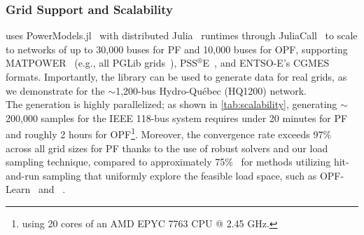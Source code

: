 \subsubsection{Grid Support and Scalability}
\datakit uses PowerModels.jl~\cite{powermodels} with distributed Julia~\cite{julia} runtimes through JuliaCall~\cite{juliacall} to scale to networks of up to 30{,}000 buses for PF and 10{,}000 buses for OPF, supporting MATPOWER~\cite{matpower} (e.g., all PGLib grids~\cite{pglib}), PSS$^{\circledR}$E~\cite{siemens_psse_v34}, and ENTSO-E's CGMES~\cite{entsoe_cim_network_model_management_guide} formats. Importantly, the library can be used to generate data for real grids, as we demonstrate for the $\sim$1{,}200-bus Hydro-Qu\'ebec (HQ1200) network.\\

The generation is highly parallelized; as shown in \cref{tab:scalability}, generating $\sim$200,000 samples for the IEEE 118-bus system requires under 20 minutes for PF and roughly 2 hours for OPF\footnote{using 20 cores of an AMD EPYC 7763 CPU @ 2.45 GHz.}. Moreover, the convergence rate exceeds 97\% across all grid sizes for PF thanks to the use of robust solvers and our load sampling technique, compared to approximately 75\%~\cite{hitandrun} for methods utilizing hit-and-run sampling that uniformly explore the feasible load space, such as OPF-Learn~\cite{opflearn} and \pfdelta~\cite{NEURIPS2025_d000ef56}.
\begin{table}
\centering
\caption{Time required to generate approximately 200,000 samples with N-1 topology perturbations for different grid sizes. The reported number of samples corresponds to successfully converged samples. Refer to~\cite{puech2025gridfmdatakitv1pythonlibraryscalable} for details on runtimes.}\label{tab:scalability}
\end{table}

